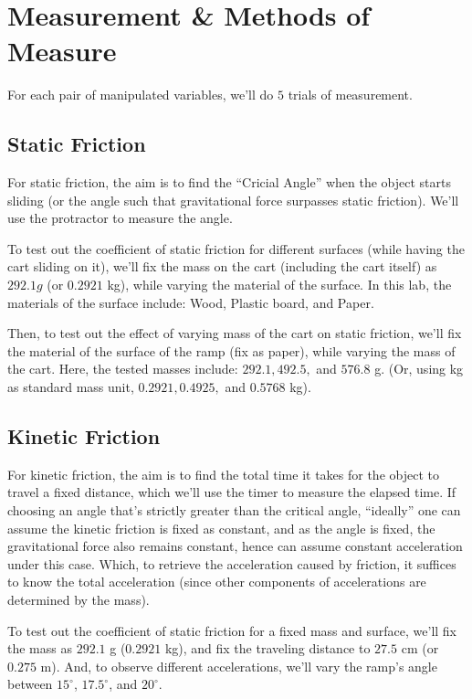 \documentclass{article}
\begin{document}
\section{Measurement \& Methods of Measure}
For each pair of manipulated variables, we'll do $5$ trials of measurement.

\subsection{Static Friction}
For static friction, the aim is to find the ``Cricial Angle'' when the object starts sliding (or the angle such that gravitational force surpasses static friction).  We'll use the protractor to measure the angle.

To test out the coefficient of static friction for different surfaces (while having the cart sliding on it), we'll fix the mass on the cart (including the cart itself) as $292.1 g$ (or $0.2921$ kg), while varying the material of the surface. In this lab, the materials of the surface include: Wood, Plastic board, and Paper.

Then, to test out the effect of varying mass of the cart on static friction, we'll fix the material of the surface of the ramp (fix as paper), while varying the mass of the cart. Here, the tested masses include: $292.1, 492.5,$ and $576.8$ g. (Or, using kg as standard mass unit, $0.2921, 0.4925,$ and $0.5768$ kg).

\subsection{Kinetic Friction}
For kinetic friction, the aim is to find the total time it takes for the object to travel a fixed distance, which we'll use the timer to measure the elapsed time. If choosing an angle that's strictly greater than the critical angle, ``ideally'' one can assume the kinetic friction is fixed as constant, and as the angle is fixed, the gravitational force also remains constant, hence can assume constant acceleration under this case. Which, to retrieve the acceleration caused by friction, it suffices to know the total acceleration (since other components of accelerations are determined by the mass). 

To test out the coefficient of static friction for a fixed mass and surface, we'll fix the mass as $292.1$ g ($0.2921$ kg), and fix the traveling distance to $27.5$ cm (or $0.275$ m). And, to observe different accelerations, we'll vary the ramp's angle between $15^\circ$, $17.5^\circ$, and $20^\circ$.
\end{document}
